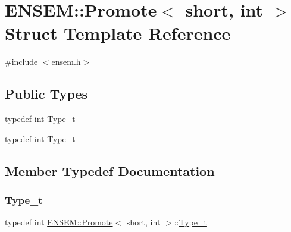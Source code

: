 \hypertarget{structENSEM_1_1Promote_3_01short_00_01int_01_4}{}\section{E\+N\+S\+EM\+:\+:Promote$<$ short, int $>$ Struct Template Reference}
\label{structENSEM_1_1Promote_3_01short_00_01int_01_4}


{\ttfamily \#include $<$ensem.\+h$>$}

\subsection*{Public Types}
\begin{DoxyCompactItemize}
\item 
typedef int \mbox{\hyperlink{structENSEM_1_1Promote_3_01short_00_01int_01_4_a6fb77c2428a4d51c4da789877c5a6e28}{Type\+\_\+t}}
\item 
typedef int \mbox{\hyperlink{structENSEM_1_1Promote_3_01short_00_01int_01_4_a6fb77c2428a4d51c4da789877c5a6e28}{Type\+\_\+t}}
\end{DoxyCompactItemize}


\subsection{Member Typedef Documentation}
\mbox{\label{structENSEM_1_1Promote_3_01short_00_01int_01_4_a6fb77c2428a4d51c4da789877c5a6e28}} 
\subsubsection{\texorpdfstring{Type\_t}{Type\_t}\hspace{0.1cm}{\footnotesize\ttfamily [1/2]}}
{\footnotesize\ttfamily typedef int \mbox{\hyperlink{structENSEM_1_1Promote}{E\+N\+S\+E\+M\+::\+Promote}}$<$ short, int $>$\+::\mbox{\hyperlink{structENSEM_1_1Promote_3_01short_00_01int_01_4_a6fb77c2428a4d51c4da789877c5a6e28}{Type\+\_\+t}}}

\mbox{\label{structENSEM_1_1Promote_3_01short_00_01int_01_4_a6fb77c2428a4d51c4da789877c5a6e28}} 
